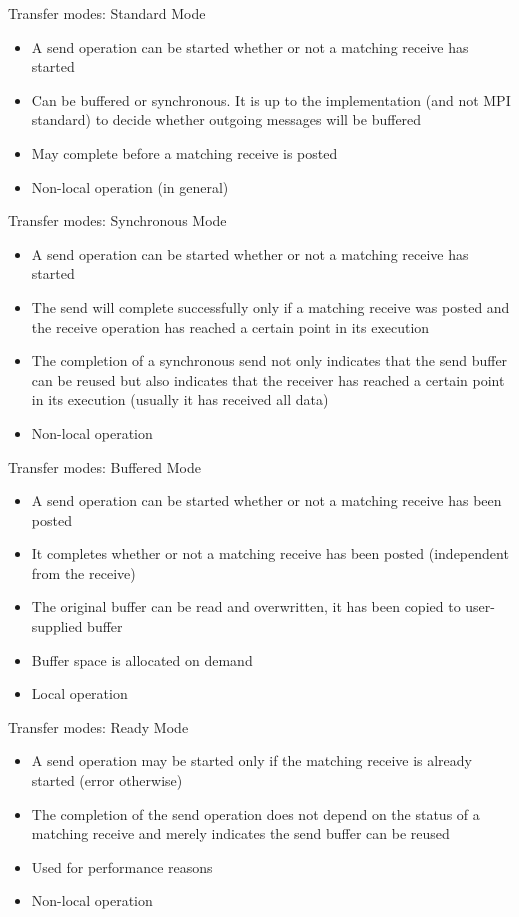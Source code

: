 \documentclass[aspectratio=43]{beamer}
\begin{document}
\begin{frame}{Transfer modes: Standard Mode}
\begin{itemize}
\item A send operation can be started whether or not a matching receive has started
\item Can be buffered or synchronous. It is up to the implementation (and not MPI standard) to decide whether outgoing messages will be buffered
\item May complete before a matching receive is posted
\item Non-local operation (in general)
\end{itemize}
\end{frame}

\begin{frame}{Transfer modes: Synchronous Mode}
\begin{itemize}
\item A send operation can be started whether or not a matching receive has started
\item The send will complete successfully only if a matching receive was posted and the receive operation has reached a certain point in its execution
\item The completion of a synchronous send not only indicates that the send buffer can be reused but also indicates that the receiver has reached a certain point in its execution (usually it has received all data)
\item Non-local operation
\end{itemize}
\end{frame}

\begin{frame}[fragile]{Transfer modes: Buffered Mode}
\begin{itemize}
\item A send operation can be started whether or not a matching receive has been posted
\item It completes whether or not a matching receive has been posted (independent from the receive)
\item The original buffer can be read and overwritten, it has been copied to user-supplied buffer
\item Buffer space is allocated on demand 
\item Local operation
\end{itemize}
\end{frame}

\begin{frame}{Transfer modes: Ready Mode}
\begin{itemize}
    \item A send operation may be started only if the matching receive is already started (error otherwise)
\item The completion of the send operation does not depend on the status of a matching receive and merely indicates the send buffer can be reused
\item Used for performance reasons
\item Non-local operation
\end{itemize}
\end{frame}
\end{document}
